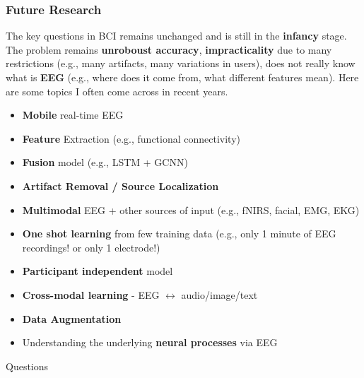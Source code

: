 \documentclass{beamer}
\begin{document}
\begin{frame}
\frametitle{Future Research}
\footnotesize
The key questions in BCI remains unchanged and is still in the \textbf{infancy} stage.  The problem remains \textbf{unroboust accuracy}, \textbf{impracticality} due to many restrictions (e.g., many artifacts,  many variations in users),  does not really know what is \textbf{EEG} (e.g., where does it come from, what different features mean).   Here are some topics I often come across in recent years.
\begin{itemize}
	\item \textbf{Mobile} real-time EEG
	\item \textbf{Feature} Extraction (e.g., functional connectivity)
	\item \textbf{Fusion} model (e.g., LSTM + GCNN)
	\item \textbf{Artifact Removal / Source Localization}
	\item \textbf{Multimodal} EEG + other sources of input (e.g., fNIRS, facial, EMG, EKG)
	\item \textbf{One shot learning} from few training data (e.g., only 1 minute of EEG recordings! or only 1 electrode!)
	\item \textbf{Participant independent }model
	\item \textbf{Cross-modal learning }- EEG $\leftrightarrow$ audio/image/text
	\item \textbf{Data Augmentation}
	\item Understanding the underlying \textbf{neural processes }via EEG
\end{itemize}
\end{frame}


\begin{frame}
\Huge{\centerline{Questions}}
\end{frame}

\end{document}

